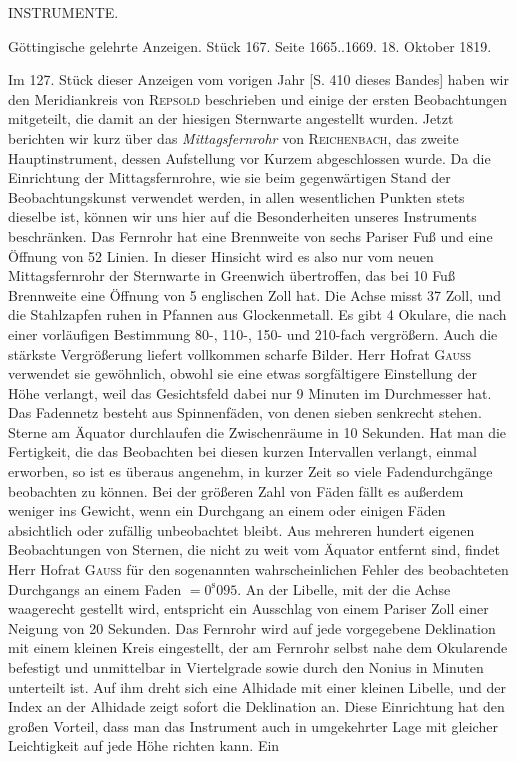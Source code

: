 \clearpage
{}
\hypertarget{native-427-part-lower}{}
\begin{center}
\Large INSTRUMENTE.
\end{center}



\begin{center}
Göttingische gelehrte Anzeigen. Stück 167. Seite 1665..1669. 18. Oktober 1819.
\end{center}





Im 127. Stück dieser Anzeigen vom vorigen Jahr [S. 410 dieses Bandes] haben wir den Meridiankreis von \textsc{Repsold} beschrieben und einige der ersten Beobachtungen mitgeteilt, die damit an der hiesigen Sternwarte angestellt wurden. Jetzt berichten wir kurz über das \emph{Mittagsfernrohr} von \textsc{Reichenbach}, das zweite Hauptinstrument, dessen Aufstellung vor Kurzem abgeschlossen wurde. Da die Einrichtung der Mittagsfernrohre, wie sie beim gegenwärtigen Stand der Beobachtungskunst verwendet werden, in allen wesentlichen Punkten stets dieselbe ist, können wir uns hier auf die Besonderheiten unseres Instruments beschränken. Das Fernrohr hat eine Brennweite von sechs Pariser Fuß und eine Öffnung von 52 Linien. In dieser Hinsicht wird es also nur vom neuen Mittagsfernrohr der Sternwarte in Greenwich übertroffen, das bei 10 Fuß Brennweite eine Öffnung von 5 englischen Zoll hat. Die Achse misst 37 Zoll, und die Stahlzapfen ruhen in Pfannen aus Glockenmetall. Es gibt 4 Okulare, die nach einer vorläufigen Bestimmung 80-, 110-, 150- und 210-fach vergrößern. Auch die stärkste Vergrößerung liefert vollkommen scharfe Bilder. Herr Hofrat \textsc{Gauss} verwendet sie gewöhnlich, obwohl sie eine etwas sorgfältigere Einstellung der Höhe verlangt, weil das Gesichtsfeld dabei nur 9 Minuten im Durchmesser hat. Das Fadennetz besteht aus Spinnenfäden, von denen sieben senkrecht stehen. Sterne am Äquator durchlaufen die Zwischenräume in 10 Sekunden. Hat man die Fertigkeit, die das Beobachten bei diesen kurzen Intervallen verlangt, einmal erworben, so ist es überaus angenehm, in kurzer Zeit so viele Fadendurchgänge beobachten zu können. Bei der größeren Zahl von Fäden fällt es außerdem weniger ins Gewicht, wenn ein Durchgang an einem oder einigen Fäden absichtlich oder zufällig unbeobachtet bleibt. Aus mehreren hundert eigenen Beobachtungen von Sternen, die nicht zu weit vom Äquator entfernt sind, findet Herr Hofrat \textsc{Gauss} für den sogenannten wahrscheinlichen Fehler des beobachteten Durchgangs an einem Faden $=0^{\mathrm s}095$. An der Libelle, mit der die Achse waagerecht gestellt wird, entspricht ein Ausschlag von einem Pariser Zoll einer Neigung von 20 Sekunden. Das Fernrohr wird auf jede vorgegebene Deklination mit einem kleinen Kreis eingestellt, der am Fernrohr selbst nahe dem Okularende befestigt und unmittelbar in Viertelgrade sowie durch den Nonius in Minuten unterteilt ist. Auf ihm dreht sich eine Alhidade mit einer kleinen Libelle, und der Index an der Alhidade zeigt sofort die Deklination an. Diese Einrichtung hat den großen Vorteil, dass man das Instrument auch in umgekehrter Lage mit gleicher Leichtigkeit auf jede Höhe richten kann. Ein 